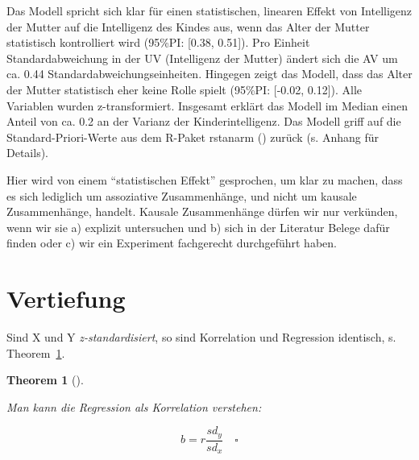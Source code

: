 \documentclass[
  ngerman,
  letterpaper,
  twoside,
  open=any]{scrbook}
\theoremstyle{definition}
\theoremstyle{plain}
\newtheorem{theorem}{Theorem}[chapter]
\theoremstyle{definition}
\theoremstyle{definition}
\theoremstyle{definition}
\theoremstyle{definition}
\theoremstyle{remark}
\begin{document}
\begin{displayquote}
Das Modell spricht sich klar für einen statistischen, linearen Effekt
von Intelligenz der Mutter auf die Intelligenz des Kindes aus, wenn das
Alter der Mutter statistisch kontrolliert wird (95\%PI: {[}0.38,
0.51{]}). Pro Einheit Standardabweichung in der UV (Intelligenz der
Mutter) ändert sich die AV um ca. 0.44 Standardabweichungseinheiten.
Hingegen zeigt das Modell, dass das Alter der Mutter statistisch eher
keine Rolle spielt (95\%PI: {[}-0.02, 0.12{]}). Alle Variablen wurden
z-transformiert. Insgesamt erklärt das Modell im Median einen Anteil von
ca. 0.2 an der Varianz der Kinderintelligenz. Das Modell griff auf die
Standard-Priori-Werte aus dem R-Paket rstanarm
() zurück (s. Anhang
für Details).
\end{displayquote}

\begin{tcolorbox}[enhanced jigsaw, arc=.35mm, bottomrule=.15mm, bottomtitle=1mm, breakable, colback=white, colbacktitle=quarto-callout-important-color!10!white, colframe=quarto-callout-important-color-frame, coltitle=black, left=2mm, leftrule=.75mm, opacityback=0, opacitybacktitle=0.6, rightrule=.15mm, title=\textcolor{quarto-callout-important-color}{\faExclamation}\hspace{0.5em}{Wichtig}, titlerule=0mm, toprule=.15mm, toptitle=1mm]

Hier wird von einem \enquote{statistischen Effekt} gesprochen, um klar
zu machen, dass es sich lediglich um assoziative Zusammenhänge, und
nicht um kausale Zusammenhänge, handelt. Kausale Zusammenhänge dürfen
wir nur verkünden, wenn wir sie a) explizit untersuchen und b) sich in
der Literatur Belege dafür finden oder c) wir ein Experiment fachgerecht
durchgeführt haben.

\end{tcolorbox}

\section{Vertiefung}\label{vertiefung-4}

Sind X und Y \emph{z-standardisiert}, so sind Korrelation und Regression
identisch, s. Theorem~\ref{thm-br}.

\begin{theorem}[]\protect\hypertarget{thm-br}{}\label{thm-br}

Man kann die Regression als Korrelation verstehen:

\[b = r \frac{sd_y}{sd_x}\quad \square\]

\end{theorem}
\end{document}
